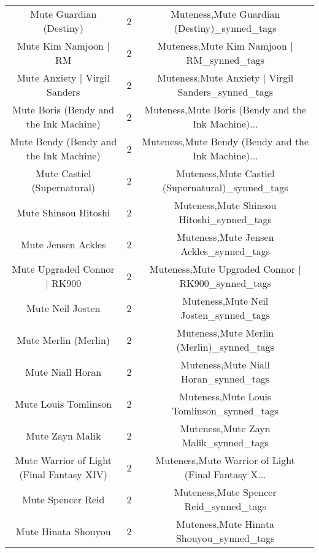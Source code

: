 \begin{table}[h!]
{\begin{tabular}{|c|c|c|}
                           Mute Guardian (Destiny) &          2 &       Muteness,Mute Guardian (Destiny)\_synned\_tags \\
                             Mute Kim Namjoon | RM &          2 &         Muteness,Mute Kim Namjoon | RM\_synned\_tags \\
                     Mute Anxiety | Virgil Sanders &          2 & Muteness,Mute Anxiety | Virgil Sanders\_synned\_tags \\
            Mute Boris (Bendy and the Ink Machine) &          2 & Muteness,Mute Boris (Bendy and the Ink Machine)... \\
            Mute Bendy (Bendy and the Ink Machine) &          2 & Muteness,Mute Bendy (Bendy and the Ink Machine)... \\
                       Mute Castiel (Supernatural) &          2 &   Muteness,Mute Castiel (Supernatural)\_synned\_tags \\
                              Mute Shinsou Hitoshi &          2 &          Muteness,Mute Shinsou Hitoshi\_synned\_tags \\
                                Mute Jensen Ackles &          2 &            Muteness,Mute Jensen Ackles\_synned\_tags \\
                      Mute Upgraded Connor | RK900 &          2 &  Muteness,Mute Upgraded Connor | RK900\_synned\_tags \\
                                  Mute Neil Josten &          2 &              Muteness,Mute Neil Josten\_synned\_tags \\
                              Mute Merlin (Merlin) &          2 &          Muteness,Mute Merlin (Merlin)\_synned\_tags \\
                                  Mute Niall Horan &          2 &              Muteness,Mute Niall Horan\_synned\_tags \\
                              Mute Louis Tomlinson &          2 &          Muteness,Mute Louis Tomlinson\_synned\_tags \\
                                   Mute Zayn Malik &          2 &               Muteness,Mute Zayn Malik\_synned\_tags \\
         Mute Warrior of Light (Final Fantasy XIV) &          2 & Muteness,Mute Warrior of Light (Final Fantasy X... \\
                                 Mute Spencer Reid &          2 &             Muteness,Mute Spencer Reid\_synned\_tags \\
                               Mute Hinata Shouyou &          2 &           Muteness,Mute Hinata Shouyou\_synned\_tags \\

\end{tabular}}
\end{table}
